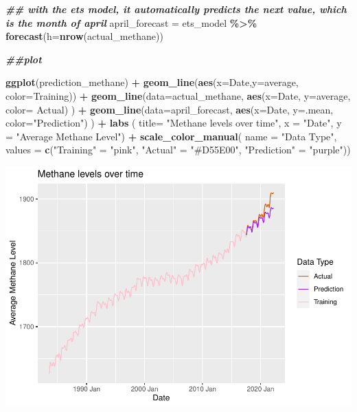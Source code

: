 \documentclass[
]{article}
\newenvironment{Shaded}{\begin{snugshade}}{\end{snugshade}}
\newcommand{\AttributeTok}[1]{\textcolor[rgb]{0.13,0.29,0.53}{#1}}
\newcommand{\DocumentationTok}[1]{\textcolor[rgb]{0.56,0.35,0.01}{\textbf{\textit{#1}}}}
\newcommand{\FunctionTok}[1]{\textcolor[rgb]{0.13,0.29,0.53}{\textbf{#1}}}
\newcommand{\NormalTok}[1]{#1}
\newcommand{\OtherTok}[1]{\textcolor[rgb]{0.56,0.35,0.01}{#1}}
\newcommand{\SpecialCharTok}[1]{\textcolor[rgb]{0.81,0.36,0.00}{\textbf{#1}}}
\newcommand{\StringTok}[1]{\textcolor[rgb]{0.31,0.60,0.02}{#1}}
\begin{document}
\begin{Shaded}
\begin{Highlighting}[]
\DocumentationTok{\#\# with the ets model, it automatically predicts the next value, which is the month of april}
\NormalTok{april\_forecast }\OtherTok{=}\NormalTok{ ets\_model }\SpecialCharTok{\%\textgreater{}\%}
  \FunctionTok{forecast}\NormalTok{(}\AttributeTok{h=}\FunctionTok{nrow}\NormalTok{(actual\_methane))}

\DocumentationTok{\#\#plot}

\FunctionTok{ggplot}\NormalTok{(prediction\_methane) }\SpecialCharTok{+}
  \FunctionTok{geom\_line}\NormalTok{(}\FunctionTok{aes}\NormalTok{(}\AttributeTok{x=}\NormalTok{Date,}\AttributeTok{y=}\NormalTok{average, }\AttributeTok{color=}\StringTok{\textquotesingle{}Training\textquotesingle{}}\NormalTok{)) }\SpecialCharTok{+}
  \FunctionTok{geom\_line}\NormalTok{(}\AttributeTok{data=}\NormalTok{actual\_methane, }\FunctionTok{aes}\NormalTok{(}\AttributeTok{x=}\NormalTok{Date, }\AttributeTok{y=}\NormalTok{average, }\AttributeTok{color=} \StringTok{\textquotesingle{}Actual\textquotesingle{}}\NormalTok{) ) }\SpecialCharTok{+}
  \FunctionTok{geom\_line}\NormalTok{(}\AttributeTok{data=}\NormalTok{april\_forecast, }\FunctionTok{aes}\NormalTok{(}\AttributeTok{x=}\NormalTok{Date, }\AttributeTok{y=}\NormalTok{.mean, }\AttributeTok{color=}\StringTok{"Prediction"}\NormalTok{) ) }\SpecialCharTok{+}
  \FunctionTok{labs}\NormalTok{ ( }\AttributeTok{title=} \StringTok{"Methane levels over time"}\NormalTok{,}
         \AttributeTok{x =} \StringTok{"Date"}\NormalTok{,}
         \AttributeTok{y =} \StringTok{"Average Methane Level"}\NormalTok{) }\SpecialCharTok{+}
  \FunctionTok{scale\_color\_manual}\NormalTok{( }\AttributeTok{name =} \StringTok{"Data Type"}\NormalTok{, }
                      \AttributeTok{values =} \FunctionTok{c}\NormalTok{(}\StringTok{"Training"} \OtherTok{=} \StringTok{"pink"}\NormalTok{, }\StringTok{"Actual"} \OtherTok{=} \StringTok{"\#D55E00"}\NormalTok{,}
                                                     \StringTok{"Prediction"} \OtherTok{=} \StringTok{"purple"}\NormalTok{))}
\end{Highlighting}
\end{Shaded}

\includegraphics{MontgomeryR_Assignment3_files/figure-latex/unnamed-chunk-16-1.pdf}
\end{document}
